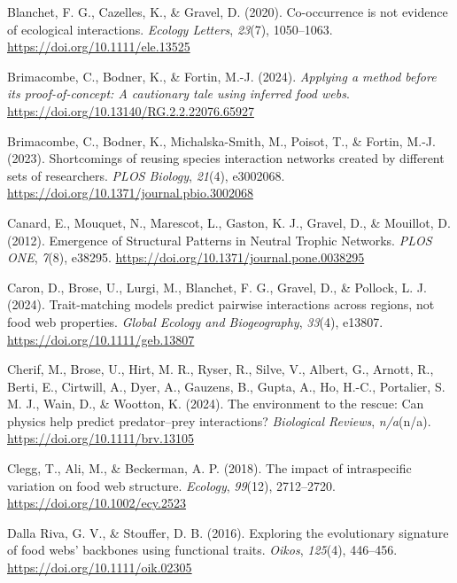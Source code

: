 \documentclass[
]{article}
\newlength{\cslhangindent}
\newenvironment{CSLReferences}[2] %
 {\begin{list}{}{%
  \setlength{\itemindent}{0pt}
  \setlength{\leftmargin}{0pt}
  \setlength{\parsep}{0pt}
  \ifodd #1
   \setlength{\leftmargin}{\cslhangindent}
   \setlength{\itemindent}{-1\cslhangindent}
  \fi
  \setlength{\itemsep}{#2\baselineskip}}}
 {\end{list}}
\begin{document}
\begin{CSLReferences}{1}{0}
Blanchet, F. G., Cazelles, K., \& Gravel, D. (2020). Co-occurrence is
not evidence of ecological interactions. \emph{Ecology Letters},
\emph{23}(7), 1050--1063. \url{https://doi.org/10.1111/ele.13525}

Brimacombe, C., Bodner, K., \& Fortin, M.-J. (2024). \emph{Applying a
method before its proof-of-concept: {A} cautionary tale using inferred
food webs}. \url{https://doi.org/10.13140/RG.2.2.22076.65927}

Brimacombe, C., Bodner, K., Michalska-Smith, M., Poisot, T., \& Fortin,
M.-J. (2023). Shortcomings of reusing species interaction networks
created by different sets of researchers. \emph{PLOS Biology},
\emph{21}(4), e3002068.
\url{https://doi.org/10.1371/journal.pbio.3002068}

Canard, E., Mouquet, N., Marescot, L., Gaston, K. J., Gravel, D., \&
Mouillot, D. (2012). Emergence of {Structural Patterns} in {Neutral
Trophic Networks}. \emph{PLOS ONE}, \emph{7}(8), e38295.
\url{https://doi.org/10.1371/journal.pone.0038295}

Caron, D., Brose, U., Lurgi, M., Blanchet, F. G., Gravel, D., \&
Pollock, L. J. (2024). Trait-matching models predict pairwise
interactions across regions, not food web properties. \emph{Global
Ecology and Biogeography}, \emph{33}(4), e13807.
\url{https://doi.org/10.1111/geb.13807}

Cherif, M., Brose, U., Hirt, M. R., Ryser, R., Silve, V., Albert, G.,
Arnott, R., Berti, E., Cirtwill, A., Dyer, A., Gauzens, B., Gupta, A.,
Ho, H.-C., Portalier, S. M. J., Wain, D., \& Wootton, K. (2024). The
environment to the rescue: Can physics help predict predator--prey
interactions? \emph{Biological Reviews}, \emph{n/a}(n/a).
\url{https://doi.org/10.1111/brv.13105}

Clegg, T., Ali, M., \& Beckerman, A. P. (2018). The impact of
intraspecific variation on food web structure. \emph{Ecology},
\emph{99}(12), 2712--2720. \url{https://doi.org/10.1002/ecy.2523}

Dalla Riva, G. V., \& Stouffer, D. B. (2016). Exploring the evolutionary
signature of food webs' backbones using functional traits. \emph{Oikos},
\emph{125}(4), 446--456. \url{https://doi.org/10.1111/oik.02305}


\end{CSLReferences}
\end{document}
